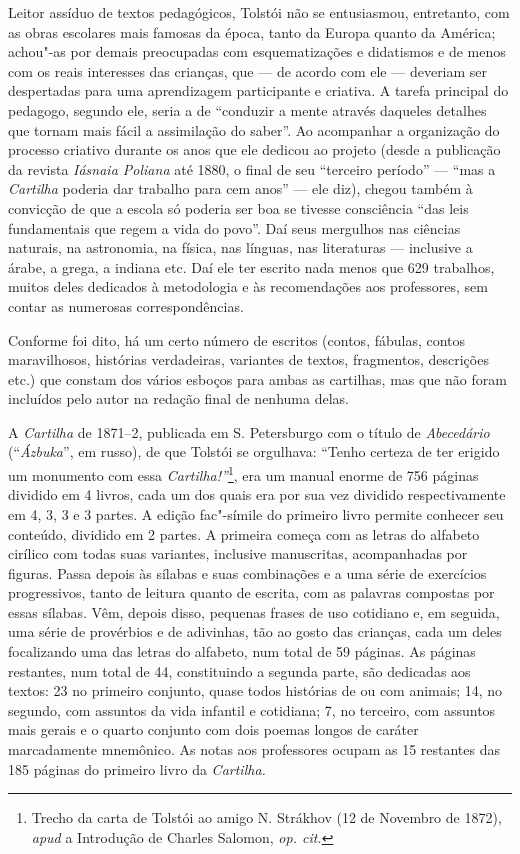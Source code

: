 Leitor assíduo de textos pedagógicos, Tolstói não se entusiasmou,
entretanto, com as obras escolares mais famosas da época, tanto da
Europa quanto da América; achou"-as por demais preocupadas com
esquematizações e didatismos e de menos com os reais interesses das
crianças, que --- de acordo com ele --- deveriam ser despertadas para uma
aprendizagem participante e criativa. A tarefa principal do pedagogo,
segundo ele, seria a de ``conduzir a mente através daqueles detalhes que
tornam mais fácil a assimilação do saber''. Ao acompanhar a organização
do processo criativo durante os anos que ele dedicou ao projeto (desde a
publicação da revista \emph{Iásnaia Poliana} até 1880, o final de seu
``terceiro período'' --- ``mas a \emph{Cartilha} poderia dar trabalho para
cem anos'' --- ele diz), chegou também à convicção de que a escola só
poderia ser boa se tivesse consciência ``das leis fundamentais que regem
a vida do povo''. Daí seus mergulhos nas ciências naturais, na
astronomia, na física, nas línguas, nas literaturas --- inclusive a árabe,
a grega, a indiana etc. Daí ele ter escrito nada menos que 629
trabalhos, muitos deles dedicados à metodologia e às recomendações aos
professores, sem contar as numerosas correspondências. 

Conforme foi dito, há um certo número de escritos (contos, fábulas,
contos maravilhosos, histórias verdadeiras, variantes de textos,
fragmentos, descrições etc.) que constam dos vários esboços para ambas
as cartilhas, mas que não foram incluídos pelo autor na redação final de
nenhuma delas.

A \emph{Cartilha} de 1871--2, publicada em S. Petersburgo com o título
de \emph{Abecedário} (``\emph{Ázbuka}'', em russo), de que Tolstói se
orgulhava: ``Tenho certeza de ter erigido um monumento com
essa \emph{Cartilha!''}\footnote{Trecho da carta de Tolstói ao amigo
  N. Strákhov (12 de Novembro de 1872), \emph{apud} a Introdução de
  Charles Salomon, \emph{op. cit.}}, era um manual enorme de 756 páginas
dividido em 4 livros, cada um dos quais era por sua vez dividido
respectivamente em 4, 3, 3 e 3 partes. A edição fac"-símile do primeiro
livro permite conhecer seu conteúdo, dividido em 2 partes. A primeira
começa com as letras do alfabeto cirílico com todas suas variantes,
inclusive manuscritas, acompanhadas por figuras. Passa depois às sílabas
e suas combinações e a uma série de exercícios progressivos, tanto de
leitura quanto de escrita, com as palavras compostas por essas sílabas.
Vêm, depois disso, pequenas frases de uso cotidiano e, em seguida, uma
série de provérbios e de adivinhas, tão ao gosto das crianças, cada um
deles focalizando uma das letras do alfabeto, num total de 59 páginas.
As páginas restantes, num total de 44, constituindo a segunda parte, são
dedicadas aos textos: 23 no primeiro conjunto, quase todos histórias de
ou com animais; 14, no segundo, com assuntos da vida infantil e
cotidiana; 7, no terceiro, com assuntos mais gerais e o quarto conjunto
com dois poemas longos de caráter marcadamente mnemônico. As notas aos
professores ocupam as 15 restantes das 185 páginas do primeiro livro
da \emph{Cartilha.}

